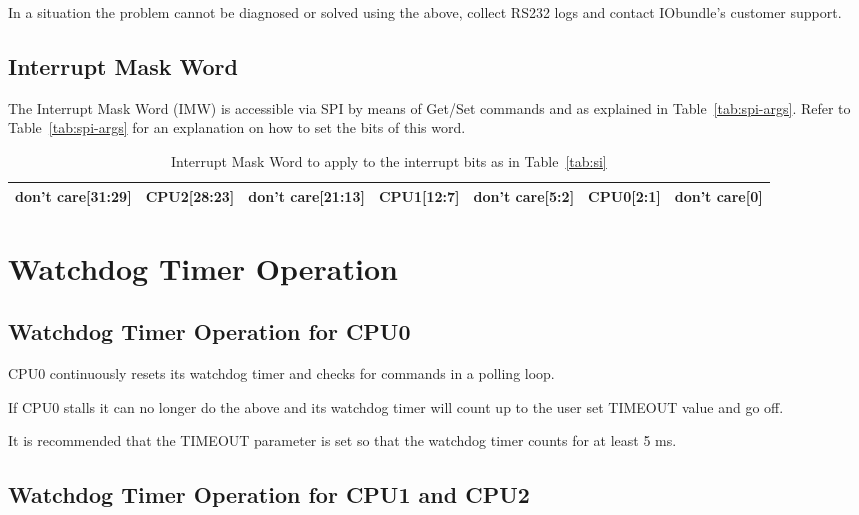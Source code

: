 \documentclass{rep}
\theoremstyle{plain}
\begin{document}
In a situation the problem cannot be diagnosed or solved using the above,
collect RS232 logs and contact IObundle's customer support.

\subsection{Interrupt Mask Word}
\label{sec:intrrptMask}

The Interrupt Mask Word (IMW) is accessible via SPI by means of
Get/Set commands and as explained in Table~\ref{tab:spi-args}. Refer to
Table~\ref{tab:spi-args} for an explanation on how to set the bits of
this word.

\begin{table}[H]
  \begin{center}
    \begin{tabular}{|c|c|c|c|c|c|c|}
      \hline
      \hline
      \rowcolor{iob-green}
      \small{don't care[31:29]} & \textbf{CPU2[28:23]}  & \small{don't care[21:13]} & \textbf{CPU1[12:7]}  & \small{don't care[5:2]} & \textbf{CPU0[2:1]} & \small{don't care[0]}\\
      \hline
      \hline
    \end{tabular}
    \caption{Interrupt Mask Word to apply to the interrupt bits as in Table~\ref{tab:si} }
    \label{tab:intrrptMask}
  \end{center}
\end{table}

\clearpage

\section{Watchdog Timer Operation}
\label{sec:wtd}

\subsection{Watchdog Timer Operation for CPU0}

CPU0 continuously resets its watchdog timer and checks for commands in a polling
loop.

If CPU0 stalls it can no longer do the above and its watchdog timer will
count up to the user set TIMEOUT value and go off.

It is recommended that the TIMEOUT parameter is set so that the
watchdog timer counts for at least 5 ms.

\subsection{Watchdog Timer Operation for CPU1 and CPU2}
\end{document}
